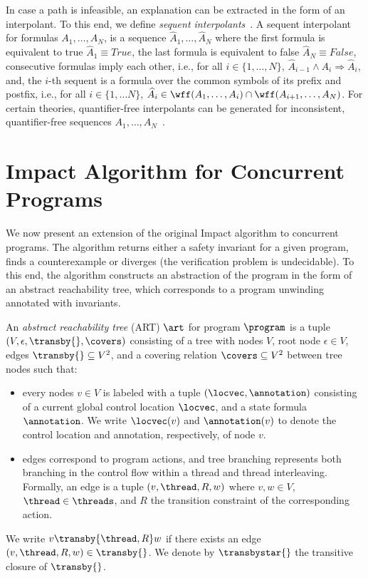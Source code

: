 \documentclass[conference]{IEEEtran}
\begin{document}
In case a path is infeasible, an explanation can be extracted in the form of
an interpolant.   To this end, we define \emph{sequent
interpolants}~\cite{DBLP:journals/tcs/McMillan05}.  A sequent interpolant
for formulas $A_1,\ldots,A_N$, is a sequence $\widehat A_1,\ldots, \widehat
A_N$ where the first formula is equivalent to true $\widehat A_1\equiv
\mathit{True}$, the last formula is equivalent to false $\widehat A_N\equiv
\mathit{False}$, consecutive formulas imply each other, i.e., for all
$i\in\{1,\ldots,N\}$, $\widehat A_{i-1}\wedge A_i \Rightarrow \widehat A_i$,
and, the $i$-th sequent is a formula over the common symbols of its prefix
and postfix, i.e., for all $i\in\{1,\ldots N\}$, $\widehat A_{i}\in
\wff(A_1,\ldots,A_i) \cap \wff(A_{i+1},\ldots,A_N)$.  For certain
theories, quantifier-free interpolants can be generated for inconsistent,
quantifier-free sequences
$A_1,\ldots,A_N$~\cite{DBLP:journals/tcs/McMillan05}.

\section{Impact Algorithm for Concurrent Programs}
\label{sec:algo}

We now present an extension of the original Impact algorithm to
concurrent programs.  The algorithm returns either a safety invariant for a
given program, finds a counterexample or diverges (the verification problem
is undecidable).  To this end, the algorithm constructs an abstraction of
the program in the form of an abstract reachability tree, which corresponds
to a program unwinding annotated with invariants.

\begin{center}
  \begin{define}[ART]
    An \emph{abstract reachability tree} (ART) $\art$ for program $\program$ is a tuple
    $(V,\epsilon,\transby{},\covers)$ consisting of a tree with nodes $V$, root node
    $\epsilon \in V$, edges $\transby{} \subseteq V^2$, and a covering relation $\covers
    \subseteq V^2$ between tree nodes such that:
    \begin{itemize}
      \item every nodes $v\in V$ is labeled with a tuple $(\locvec,\annotation)$ consisting of
      a current global control location $\locvec$, and a state formula
      $\annotation$.
      We write $\locvec(v)$ and $\annotation(v)$ 
      to denote the control location and annotation, respectively, of node $v$.

      \item edges correspond to program actions, and
      tree branching represents both branching in the control flow
      within a thread and thread interleaving.  Formally, an edge is a
      tuple $(v,\thread,R,w)$ where $v,w \in V$,
      $\thread\in\threads$, and $R$ the transition
      constraint of the corresponding action.
    \end{itemize} 
    We write $v\transby{\thread, R} w$ if there exists an edge $(v,\thread,R,w)\in
    \transby{}$.  We denote by $\transbystar{}$ the transitive closure of
    $\transby{}$.
  \end{define}         
\end{center}
\end{document}
